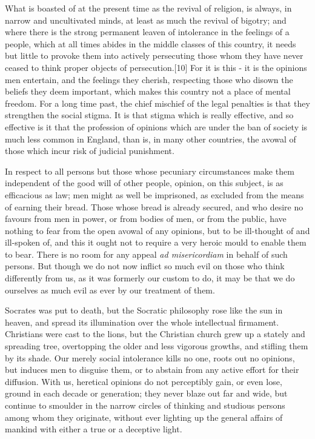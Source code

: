 What is boasted of at the present time as the revival of religion, is always, in narrow and uncultivated minds, at least as much the revival of bigotry; and where there is the strong permanent leaven of intolerance in the feelings of a people, which at all times abides in the middle classes of this country, it needs but little to provoke them into actively persecuting those whom they have never ceased to think proper objects of persecution.[10] For it is this - it is the opinions men entertain, and the feelings they cherish, respecting those who disown the beliefs they deem important, which makes this country not a place of mental freedom. For a long time past, the chief mischief of the legal penalties is that they strengthen the social stigma. It is that stigma which is really effective, and so effective is it that the profession of opinions which are under the ban of society is much less common in England, than is, in many other countries, the avowal of those which incur risk of judicial punishment.\par

In respect to all persons but those whose pecuniary circumstances make them independent of the good will of other people, opinion, on this subject, is as efficacious as law; men might as well be imprisoned, as excluded from the means of earning their bread. Those whose bread is already secured, and who desire no favours from men in power, or from bodies of men, or from the public, have nothing to fear from the open avowal of any opinions, but to be ill-thought of and ill-spoken of, and this it ought not to require a very heroic mould to enable them to bear. There is no room for any appeal \textit{ad misericordiam} in behalf of such persons. But though we do not now inflict so much evil on those who think differently from us, as it was formerly our custom to do, it may be that we do ourselves as much evil as ever by our treatment of them.\par

Socrates was put to death, but the Socratic philosophy rose like the sun in heaven, and spread its illumination over the whole intellectual firmament. Christians were cast to the lions, but the Christian church grew up a stately and spreading tree, overtopping the older and less vigorous growths, and stifling them by its shade. Our merely social intolerance kills no one, roots out no opinions, but induces men to disguise them, or to abstain from any active effort for their diffusion. With us, heretical opinions do not perceptibly gain, or even lose, ground in each decade or generation; they never blaze out far and wide, but continue to smoulder in the narrow circles of thinking and studious persons among whom they originate, without ever lighting up the general affairs of mankind with either a true or a deceptive light.\par

